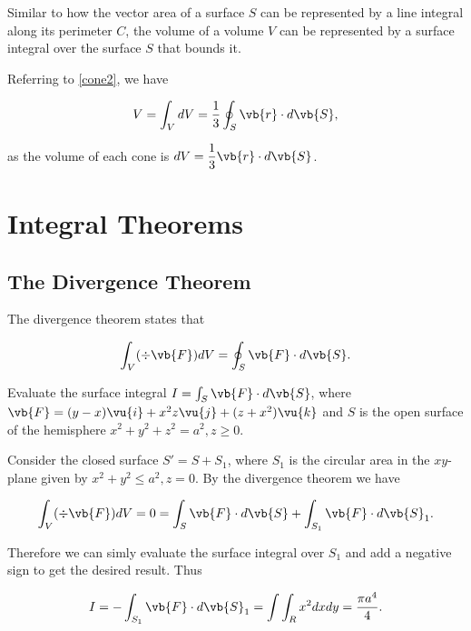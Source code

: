 \documentclass[english,a4paper,12pt]{report}
\begin{document}
Similar to how the vector area of a surface \(S\) can be represented by a line integral along its perimeter \(C\), the volume of a volume \(V\)  can be represented by a surface integral over the surface \(S\) that bounds it.

Referring to \cref{cone2}, we have

\begin{equation}
	V = \int_{V}^{} dV = \frac{1}{3} \oint_{S} \vb{r} \cdot d\vb{S}, 
\end{equation}

as the volume of each cone is \(\displaystyle dV = \frac{1}{3} \vb{r} \cdot d\vb{S}  \). 


\section{Integral Theorems}

\subsection{The Divergence Theorem}
The divergence theorem states that

\begin{equation} \label{divthmm} 
	\int _{V}(\div{\vb{F} } )dV = \oint_{S} \vb{F} \cdot d\vb{S} .
\end{equation}

{Evaluate the surface integral \(I = \int_{S}^{} \vb{F} \cdot d\vb{S}  \), where \(\vb{F} = (y-x)\vu{i} + x^2z \vu{j} + (z+x^2) \vu{k}\) and \(S\) is the open surface of the hemisphere \(x^2 + y^2 + z^2 = a^2, z \ge 0\).}
{Consider the closed surface \(S' = S + S_1 \), where \(S_1 \) is the circular area in the \(xy\)-plane given by \(x^2 + y^2 \le a^2, z=0\). By the divergence theorem we have

\begin{equation}
	\int_{V}^{} (\div{\vb{F} } )dV = 0 = \int_{S}^{} \vb{F} \cdot d\vb{S} + \int_{S_1 }^{} \vb{F} \cdot d\vb{S}_{1} .  
\end{equation}

Therefore we can simly evaluate the surface integral over \(S_1 \) and add a negative sign to get the desired result. Thus

\begin{equation}
	I = - \int_{S_1 }^{} \vb{F} \cdot d\vb{S} _{1} = \int \int_{R}^{} x^2dxdy = \frac{\pi a^4}{4}.   
\end{equation}
} 
\end{document}
